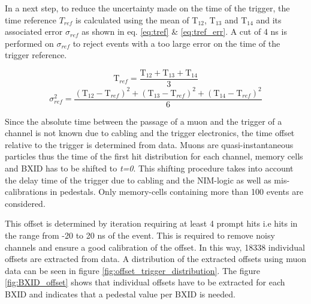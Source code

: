 In a next step, to reduce the uncertainty made on the time of the trigger, the time reference $T_{ref}$ is calculated using the mean of T$_{12}$, T$_{13}$ and T$_{14}$ and its associated error $\sigma_{ref}$ as shown in eq. \ref{eq:tref} \& \ref{eq:tref_err}. A cut of 4 ns is performed on $\sigma_{ref}$ to reject events with a too large error on the time of the trigger reference.

\begin{equation} \label{eq:tref}
	\text{T}_{ref} = \frac{\text{T}_{12} + \text{T}_{13} + \text{T}_{14}}{3}
\end{equation}
\begin{equation} \label{eq:tref_err}
	\sigma_{ref}^2 = \frac{ (\text{T}_{12} - \text{T}_{ref})^2 + (\text{T}_{13} - \text{T}_{ref})^2  + (\text{T}_{14} - \text{T}_{ref})^2 }{6}
\end{equation}

Since the absolute time between the passage of a muon and the trigger of a channel is not known due to cabling and the trigger electronics, the time offset relative to the trigger is determined from data. Muons are quasi-instantaneous particles thus the time of the first hit distribution for each channel, memory cells and BXID has to be shifted to \textit{t=0}. This shifting procedure takes into account the delay time of the trigger due to cabling and the NIM-logic as well as mis-calibrations in pedestals. Only memory-cells containing more than 100 events are considered.

This offset is determined by iteration requiring at least 4 prompt hits i.e hits in the range from -20 to 20 ns of the event. This is required to remove noisy channels and ensure a good calibration of the offset. In this way, 18338 individual offsets are extracted from data. A distribution of the extracted offsets using muon data can be seen in figure \ref{fig:offset_trigger_distribution}. The figure \ref{fig:BXID_offset} shows that individual offsets have to be extracted for each BXID and indicates that a pedestal value per BXID is needed.

